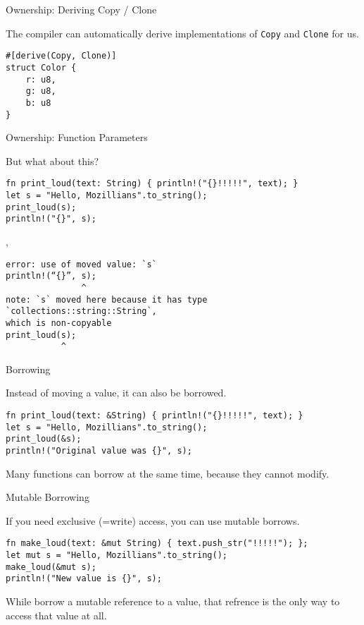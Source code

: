 
\begin{frame}[fragile]{Ownership: Deriving Copy / Clone}

The compiler can automatically derive implementations of \texttt{Copy} and
\texttt{Clone} for us.

\begin{verbatim}
#[derive(Copy, Clone)]
struct Color {
    r: u8,
    g: u8,
    b: u8
}
\end{verbatim}

\end{frame}


\begin{frame}[fragile]{Ownership: Function Parameters}

But what about this?

\begin{verbatim}
fn print_loud(text: String) { println!("{}!!!!!", text); }
let s = "Hello, Mozillians".to_string();
print_loud(s);
println!("{}", s);
\end{verbatim}

\pause
\sep

\begin{verbatim}
error: use of moved value: `s`
println!(“{}”, s);
               ^
note: `s` moved here because it has type `collections::string::String`,
which is non-copyable
print_loud(s);
           ^
\end{verbatim}

\end{frame}


\begin{frame}[fragile]{Borrowing}

Instead of moving a value, it can also be borrowed.

\begin{verbatim}
fn print_loud(text: &String) { println!("{}!!!!!", text); }
let s = "Hello, Mozillians".to_string();
print_loud(&s);
println!("Original value was {}", s);
\end{verbatim}

Many functions can borrow at the same time, because they cannot modify.

\end{frame}


\begin{frame}[fragile]{Mutable Borrowing}

If you need exclusive (=write) access, you can use mutable borrows.

\begin{verbatim}
fn make_loud(text: &mut String) { text.push_str("!!!!!"); };
let mut s = "Hello, Mozillians".to_string();
make_loud(&mut s);
println!("New value is {}", s);
\end{verbatim}

While borrow a mutable reference to a value, that refrence is the only way to
access that value at all.
\end{frame}

